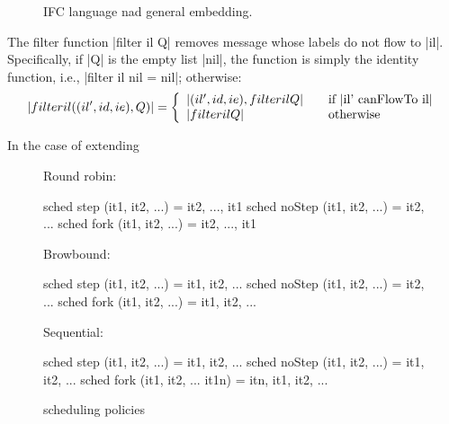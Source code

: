 \begin{figure}
\caption{IFC language nad general embedding.}
\label{fig:ml}
\end{figure}

The filter function |filter il Q| removes message whose labels do not
flow to |il|. Specifically, if |Q| is the empty list |nil|, the
function is simply the identity function, i.e.,
|filter il nil = nil|; otherwise:
\[
|filter il ((il', id, ie) , Q )| = \left\{
\begin{array}{l l}
|(il', id, ie) , filter il Q| & \quad \text{if |il' canFlowTo il|}\\
|filter il Q| & \quad \text{otherwise}
\end{array} \right.
\]


In the case of extending

\begin{figure}
  Round robin:
\begin{code}
  sched step (it1, it2, ...)    = it2, ..., it1
  sched noStep (it1, it2, ...)  = it2, ...
  sched fork (it1, it2, ...)    = it2, ..., it1
\end{code}
  Browbound:
\begin{code}
  sched step (it1, it2, ...)    = it1, it2, ...
  sched noStep (it1, it2, ...)  = it2, ...
  sched fork (it1, it2, ...)    = it1, it2, ...
\end{code}
  Sequential:
\begin{code}
  sched step (it1, it2, ...)       = it1, it2, ...
  sched noStep (it1, it2, ...)     = it1, it2, ...
  sched fork (it1, it2, ... it1n)  = itn, it1, it2, ...
\end{code}
\caption{scheduling policies}
\end{figure}


